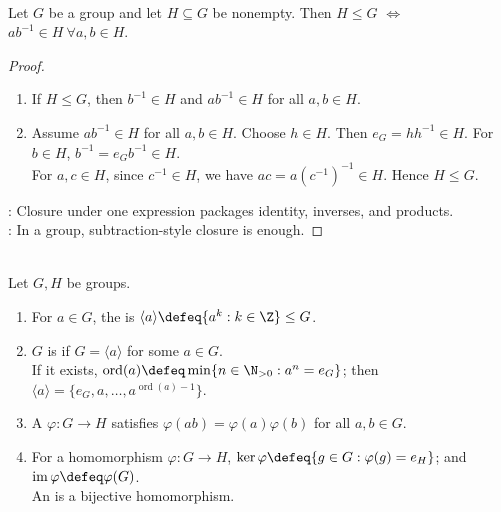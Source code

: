 \begin{proposition} \label{prop:subgroup-test} \\
Let $G$ be a group and let $H\subseteq G$ be nonempty. Then $H\leq G$ $\iff$ $ab^{-1}\in H \ \forall a,b\in H$.
\begin{proof}
\begin{enumerate}[label=\roman*.]
\setlength{\itemsep}{0pt}
\item[$(\Rightarrow)$] If $H\leq G$, then $b^{-1}\in H$ and $ab^{-1}\in H$ for all $a,b\in H$.
\item[$(\Leftarrow)$] Assume $ab^{-1}\in H$ for all $a,b\in H$. Choose $h\in H$. Then $e_G=hh^{-1}\in H$. For $b\in H$, $b^{-1}=e_Gb^{-1}\in H$.\\
For $a,c\in H$, since $c^{-1}\in H$, we have $ac=a(c^{-1})^{-1}\in H$. Hence $H\leq G$.
\end{enumerate}
: Closure under one expression packages identity, inverses, and products.\\
: In a group, subtraction-style closure is enough.
\end{proof}
\end{proposition}

\begin{definition} \label{def:cyclic-group-and-generated-subgroup} \label{def:group-homomorphism-kernel-image} \\
Let $G,H$ be groups.
\begin{enumerate}[label=(\roman*)]
\setlength{\itemsep}{0pt}
\item For $a\in G$, the  is $\langle a\rangle\defeq\{a^k:k\in\Z\}\leq G$.
\item $G$ is  if $G=\langle a\rangle$ for some $a\in G$.\\
If it exists, $\operatorname{ord}(a)\defeq\min\{n\in\N_{>0}:a^n=e_G\}$; then $\langle a\rangle=\{e_G,a,\ldots,a^{\operatorname{ord}(a)-1}\}$.
\item A  $\varphi:G\to H$ satisfies $\varphi(ab)=\varphi(a)\varphi(b)$ for all $a,b\in G$.
\item For a homomorphism $\varphi:G\to H$, $\ker\varphi\defeq\{g\in G:\varphi(g)=e_H\}$; and $\operatorname{im}\varphi\defeq\varphi(G)$.\\
An  is a bijective homomorphism.
\end{enumerate}
\end{definition}

